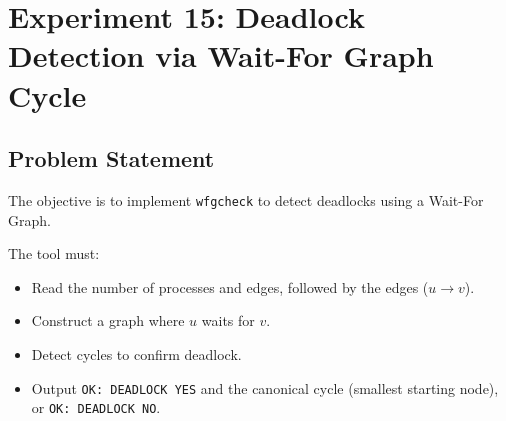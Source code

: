
\section{Experiment 15: Deadlock Detection via Wait-For Graph Cycle}

\subsection{Problem Statement}
The objective is to implement \texttt{wfgcheck} to detect deadlocks using a Wait-For Graph.

The tool must:
\begin{itemize}
    \item Read the number of processes and edges, followed by the edges ($u \to v$).
    \item Construct a graph where $u$ waits for $v$.
    \item Detect cycles to confirm deadlock.
    \item Output \verb|OK: DEADLOCK YES| and the canonical cycle (smallest starting node), or \verb|OK: DEADLOCK NO|.
\end{itemize}

